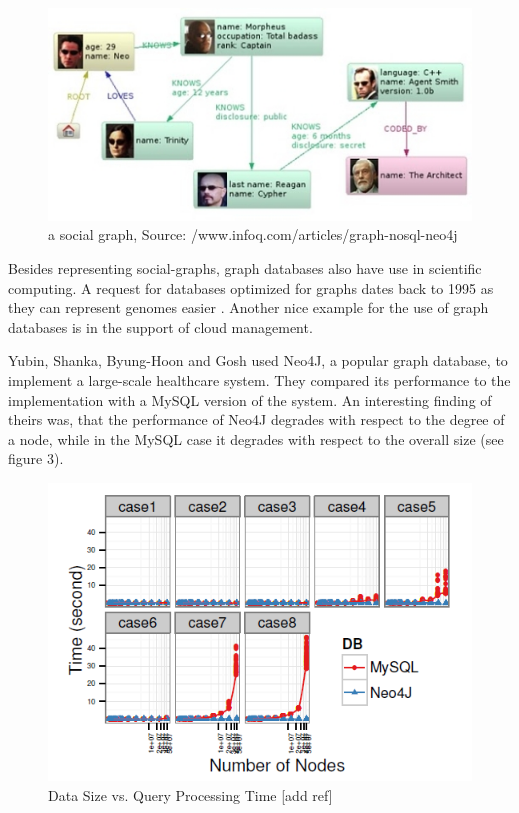 \documentclass{acm_proc_article-sp}
\begin{document}
\begin{figure}[hbtp]
	\centering
	\includegraphics[scale=0.35]{neo4j.jpg}
	\caption{a social graph, Source: /www.infoq.com/articles/graph-nosql-neo4j}
\end{figure}

Besides representing social-graphs, graph databases also have use in scientific computing. A request for databases optimized for graphs dates back to 1995 as they can represent genomes easier \cite{genome}. Another nice example for the use of graph databases is in the support of cloud management. 

Yubin, Shanka, Byung-Hoon and Gosh used Neo4J, a popular graph database, to implement a large-scale healthcare system\cite{healtcare}. They compared its performance to the implementation with a MySQL version of the system. An interesting finding of theirs was, that the performance of Neo4J degrades with respect to the degree of a node, while in the MySQL case it degrades with respect to the overall size (see figure 3).

\begin{figure}[hbtp]
	\centering
	\includegraphics[scale=0.4]{neo4j_mysql.png}
	\caption{Data Size vs. Query Processing Time [add ref]}
\end{figure}
\end{document}
